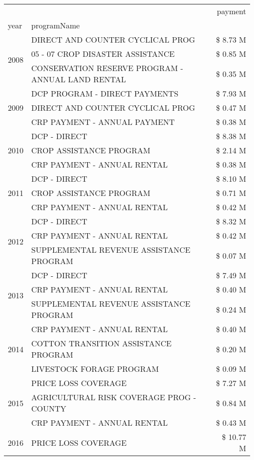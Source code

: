 \begin{tabular}{llr}
\toprule
 &  & payment \\
year & programName &  \\
\midrule
\multirow[t]{3}{*}{2008} & DIRECT AND COUNTER CYCLICAL PROG & \$ 8.73 M \\
 & 05 - 07 CROP DISASTER ASSISTANCE & \$ 0.85 M \\
 & CONSERVATION RESERVE PROGRAM - ANNUAL LAND RENTAL & \$ 0.35 M \\
\cline{1-3}
\multirow[t]{3}{*}{2009} & DCP PROGRAM - DIRECT PAYMENTS & \$ 7.93 M \\
 & DIRECT AND COUNTER CYCLICAL PROG & \$ 0.47 M \\
 & CRP PAYMENT - ANNUAL PAYMENT & \$ 0.38 M \\
\cline{1-3}
\multirow[t]{3}{*}{2010} & DCP - DIRECT & \$ 8.38 M \\
 & CROP ASSISTANCE PROGRAM & \$ 2.14 M \\
 & CRP PAYMENT - ANNUAL RENTAL & \$ 0.38 M \\
\cline{1-3}
\multirow[t]{3}{*}{2011} & DCP - DIRECT & \$ 8.10 M \\
 & CROP ASSISTANCE PROGRAM & \$ 0.71 M \\
 & CRP PAYMENT - ANNUAL RENTAL & \$ 0.42 M \\
\cline{1-3}
\multirow[t]{3}{*}{2012} & DCP - DIRECT & \$ 8.32 M \\
 & CRP PAYMENT - ANNUAL RENTAL & \$ 0.42 M \\
 & SUPPLEMENTAL REVENUE ASSISTANCE PROGRAM & \$ 0.07 M \\
\cline{1-3}
\multirow[t]{3}{*}{2013} & DCP - DIRECT & \$ 7.49 M \\
 & CRP PAYMENT - ANNUAL RENTAL & \$ 0.40 M \\
 & SUPPLEMENTAL REVENUE ASSISTANCE PROGRAM & \$ 0.24 M \\
\cline{1-3}
\multirow[t]{3}{*}{2014} & CRP PAYMENT - ANNUAL RENTAL & \$ 0.40 M \\
 & COTTON TRANSITION ASSISTANCE PROGRAM & \$ 0.20 M \\
 & LIVESTOCK FORAGE PROGRAM & \$ 0.09 M \\
\cline{1-3}
\multirow[t]{3}{*}{2015} & PRICE LOSS COVERAGE & \$ 7.27 M \\
 & AGRICULTURAL RISK COVERAGE PROG - COUNTY & \$ 0.84 M \\
 & CRP PAYMENT - ANNUAL RENTAL & \$ 0.43 M \\
\cline{1-3}
\multirow[t]{3}{*}{2016} & PRICE LOSS COVERAGE & \$ 10.77 M \\

\end{tabular}
